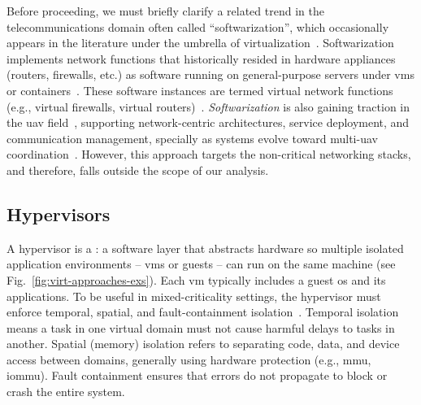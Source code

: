 Before proceeding, we must briefly clarify a related trend in the
telecommunications domain often called ``softwarization'', which occasionally
appears in the literature under the umbrella of
virtualization~\cite{pathak_uav_2020,liu_deep_2022,nogales_adaptable_2018}.
Softwarization implements network functions that historically resided in
hardware appliances (routers, firewalls, etc.) as software running on
general-purpose servers under \glspl{vm} or
containers~\cite{kumari_taxonomy_2020}. These software instances are termed
virtual network functions (e.g., virtual firewalls, virtual
routers)~\cite{cotroneo_nfv-bench_2017}.
%
\emph{Softwarization} is also gaining traction in the \gls{uav}
field~\cite{sara_softwarization_2016,pathak_uav_2020,siddiki_abir_software-defined_2023,oubbati2020softwarization},
supporting network-centric architectures, service deployment, and communication
management, specially as systems evolve toward multi-\gls{uav}
coordination~\cite{li_distributed_2024,azari_uav--uav_2020}. However, this
approach targets the non-critical networking stacks, and therefore, falls outside the scope of our analysis.


\subsection{Hypervisors}%
\label{sec:superv--hyperv}
A hypervisor is a : a software layer that abstracts hardware so
multiple isolated application environments -- \glspl{vm} or guests -- can run on
the same machine (see Fig.~\ref{fig:virt-approaches-exs}). Each \gls{vm}
typically includes a guest \gls{os} and its applications. To be useful in
mixed-criticality settings, the hypervisor must enforce temporal, spatial, and
fault-containment isolation~\cite{cinque2022virtualizing}. Temporal isolation means a task in one
virtual domain must not cause harmful delays to tasks in another. Spatial (memory)
isolation refers to separating code, data, and device access between domains,
generally using hardware protection (e.g., \gls{mmu}, \gls{iommu}). Fault
containment ensures that errors do not propagate to block or crash the entire
system.

